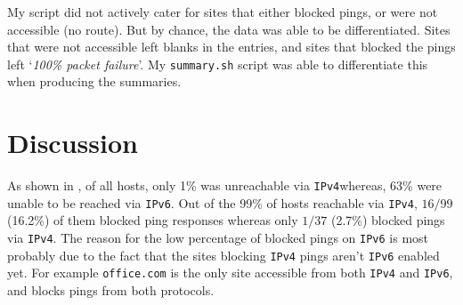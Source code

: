 \documentclass[a4paper]{article}
\def \IPF {\texttt{IPv4}}
\def \IPS {\texttt{IPv6}}
\begin{document}
My script did not actively cater for sites that either blocked pings, or were not accessible (no route).
But by chance, the data was able to be differentiated.
Sites that were not accessible left blanks in the entries, and sites that blocked the pings left `\textit{100\% packet failure}'.
My \texttt{summary.sh} script was able to differentiate this when producing the summaries.








\section{Discussion}
As shown in , of all hosts, only 1\% was unreachable via \IPF whereas, 63\% were unable to be reached via \IPS.
Out of the 99\% of hosts reachable via \IPF, $16/99$ (16.2\%) of them blocked ping responses whereas only $1/37$ (2.7\%) blocked pings via \IPF.
The reason for the low percentage of blocked pings on {\IPS} is most probably due to the fact that the sites blocking {\IPF} pings aren't {\IPS} enabled yet.
For example \texttt{office.com} is the only site accessible from both {\IPF} and {\IPS}, and blocks pings from both protocols.
\end{document}
